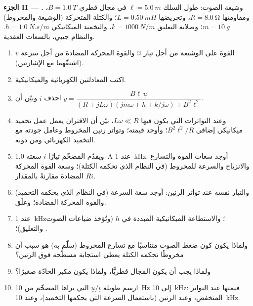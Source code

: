 \begin{problem}
\medskip
\noindent\textbf{الجزء II --- .}
وشيعة الصوت: طول السلك $\ell = \qty{5.0}{m}$ في مجال قطري $B =
\qty{1.0}{T}$، ومقاومتها $R = \qty{8.0}{\ohm}$، وتحريضها $L = \qty{0.50}{mH}$؛
والكتلة المتحركة (الوشيعة والمخروط) $m = \qty{10}{g}$؛ وصلابة التعليق
$k = \qty{1000}{N/m}$، والتخميد الميكانيكي $h = \qty{1.0}{N.s/m}$. والنظام
جيبي، بالسعات العقدية.
\begin{enumerate}[resume]
  \item القوة على الوشيعة من أجل تيار $i$؛ والقوة المحركة المضادة من أجل سرعة $v$
        (اشتقّهما مع الإشارتين).
  \item اكتب المعادلتين الكهربائية والميكانيكية.
  \item احذف $i$ وبيّن أن
        $\underline v = \dfrac{B\ell\,\underline u}{(R + jL\omega)(jm\omega + h + k/j\omega) + B^2\ell^2}$.
  \item وعند التواترات التي يكون فيها $L\omega \ll R$، بيّن أن الاقتران يعمل
        عمل تخميد ميكانيكي إضافي $B^2\ell^2/R$؛ وأوجد قيمته؛ وتواتر
        رنين المخروط وعامل جودته مع التخميد الكهربائي
        ومن دونه.
  \item ويقدّم المضخّم تيارًا $i$ سعته \qty{1.0}{A} عند \qty{1}{kHz}:
        أوجد سعات القوة والتسارع والانزياح والسرعة
        للمخروط (في النظام الذي تحكمه الكتلة)؛ وسعة القوة المحركة المضادة مقارنةً
        بالمقدار $Ri$.
  \item والتيار نفسه عند تواتر الرنين: أوجد سعة السرعة
        (في النظام الذي يحكمه التخميد) والقوة المحركة المضادة؛ وعلّق.
  \item {} عند \qty{1}{kHz}؛ والاستطاعة الميكانيكية المبددة في
        $h$ (وتُؤخذ ضياعات الصوت والتعليق)؛ .
  \item ولماذا يكون كون ضغط الصوت متناسبًا مع تسارع
        المخروط (سلّم به) هو سبب أن مخروطًا تحكمه الكتلة يعطي
        استجابة مسطّحة فوق الرنين؟
  \item ولماذا يجب أن يكون المجال قطريًّا، ولماذا يكون مكبر الحادّة صغيرًا؟
  \item ارسم طويلة  $\underline u/\underline i$ التي يراها
        المضخّم من \qty{10}{Hz} إلى \qty{10}{kHz}: قيمتها عند التواتر
        المنخفض، وعند الرنين (باستعمال السرعة التي يحكمها التخميد)،
        وعند \qty{10}{kHz}.
\end{enumerate}


\end{problem}
